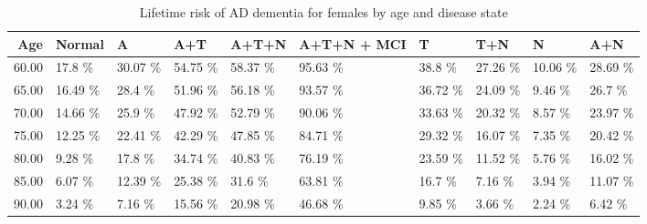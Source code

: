 \begin{table}[ht]
\centering
\begin{tabular}{rlllllllll}
  \hline
Age & Normal & A & A+T & A+T+N & A+T+N + MCI & T & T+N & N & A+N \\ 
  \hline
60.00 & 17.8 \% & 30.07 \% & 54.75 \% & 58.37 \% & 95.63 \% & 38.8 \% & 27.26 \% & 10.06 \% & 28.69 \% \\ 
  65.00 & 16.49 \% & 28.4 \% & 51.96 \% & 56.18 \% & 93.57 \% & 36.72 \% & 24.09 \% & 9.46 \% & 26.7 \% \\ 
  70.00 & 14.66 \% & 25.9 \% & 47.92 \% & 52.79 \% & 90.06 \% & 33.63 \% & 20.32 \% & 8.57 \% & 23.97 \% \\ 
  75.00 & 12.25 \% & 22.41 \% & 42.29 \% & 47.85 \% & 84.71 \% & 29.32 \% & 16.07 \% & 7.35 \% & 20.42 \% \\ 
  80.00 & 9.28 \% & 17.8 \% & 34.74 \% & 40.83 \% & 76.19 \% & 23.59 \% & 11.52 \% & 5.76 \% & 16.02 \% \\ 
  85.00 & 6.07 \% & 12.39 \% & 25.38 \% & 31.6 \% & 63.81 \% & 16.7 \% & 7.16 \% & 3.94 \% & 11.07 \% \\ 
  90.00 & 3.24 \% & 7.16 \% & 15.56 \% & 20.98 \% & 46.68 \% & 9.85 \% & 3.66 \% & 2.24 \% & 6.42 \% \\ 
   \hline
\end{tabular}
\caption{Lifetime risk of AD dementia for females by age and disease state} 
\end{table}
